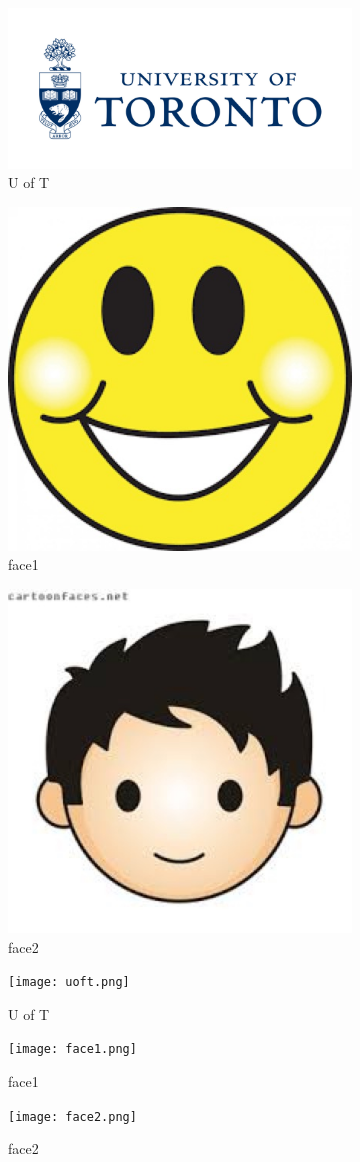\documentclass{article}
\begin{document}
\begin{figure}[!ht]
\begin{subfigure}{.35\textwidth}
  \includegraphics[width=.5\linewidth]{uoft.jpeg}
  \caption{U of T}
  \label{fig:uoft}
\end{subfigure}
\begin{subfigure}{.35\textwidth}
  \includegraphics[width=.5\linewidth]{face1.jpeg}
  \caption{face1}
  \label{fig:face1}
\end{subfigure}%
\begin{subfigure}{.35\textwidth}
  \includegraphics[width=.5\linewidth]{face2.jpeg}
  \caption{face2}
  \label{fig:face2}
\end{subfigure}
\begin{subfigure}{.35\textwidth}
  \texttt{[image: uoft.png]}
  \caption{U of T}
  \label{fig:uoft1}
\end{subfigure}%
\begin{subfigure}{.35\textwidth}
  \texttt{[image: face1.png]}
  \caption{face1}
  \label{fig:face11}
\end{subfigure}
\begin{subfigure}{.35\textwidth}
  \texttt{[image: face2.png]}
  \caption{face2}
  \label{fig:face21}%
\end{subfigure}
\caption{}
\label{fig:pcs2}
\end{figure}
\end{document}
